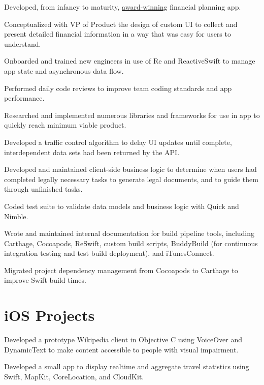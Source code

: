 \documentclass[]{jhearn-resume}
\begin{document}
\begin{minipage}[t]{0.64\textwidth}
\begin{tightemize}
\item Developed, from infancy to maturity, \href{https://tomorrow.me/trust-worthy/tomorrow-news/tomorrow-wins-at-plug-and-play-winter-summit/}{award-winning} financial planning app.
\item Conceptualized with VP of Product the design of custom UI to collect and present detailed financial information in a way that was easy for users to understand. 
\item Onboarded and trained new engineers in use of Re     and ReactiveSwift to manage app state and asynchronous data flow.
\item Performed daily code reviews to improve team coding standards and app performance.
\item Researched and implemented numerous libraries and frameworks for use in app to quickly reach minimum viable product.
\item Developed a traffic control algorithm to delay UI updates until complete, interdependent data sets had been returned by the API.
\item Developed and maintained client-side business logic to determine when users had completed legally necessary tasks to generate legal documents, and to guide them through unfinished tasks.
\item Coded test suite to validate data models and business logic with Quick and Nimble.
\item Wrote and maintained internal documentation for build pipeline tools, including Carthage, Cocoapods, ReSwift, custom build scripts, BuddyBuild (for continuous integration testing and test build deployment), and iTunesConnect.
\item Migrated project dependency management from Cocoapods to Carthage to improve Swift build times.
\end{tightemize}
\sectionsep

\section{\lowercase{i}OS Projects}
\begin{tightemize}
\item Developed a prototype Wikipedia client in Objective C using VoiceOver and DynamicText to make content accessible to people with visual impairment.
\end{tightemize}
\sectionsep

\begin{tightemize}
\item Developed a small app to display realtime and aggregate travel statistics using Swift, MapKit, CoreLocation, and CloudKit.
\end{tightemize}
\sectionsep


\end{minipage} 
\end{document}
